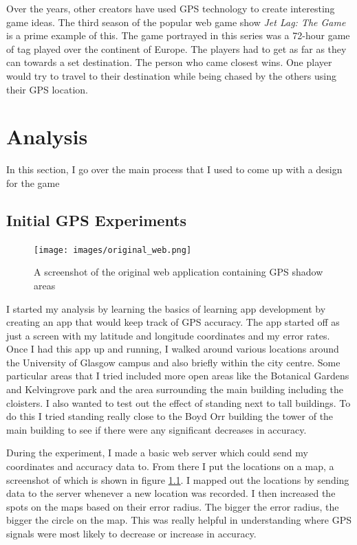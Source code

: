 \documentclass{l4proj}
\begin{document}
Over the years, other creators have used GPS technology to create interesting game ideas. The third season of the popular
web game show \emph{Jet Lag: The Game} is a prime example of this. The game portrayed in this series was a 72-hour game of
tag played over the continent of Europe. The players had to get as far as they can towards a set destination. The person
who came closest wins. One player would try to travel to their destination while being chased by the others using their
GPS location. \citep{Chase2022}

\chapter{Analysis}
\label{analysis}

In this section, I go over the main process that I used to come up with a design for the game

\section{Initial GPS Experiments}
\begin{figure}
    \centering
    \texttt{[image: images/original\_web.png]}
    \caption{A screenshot of the original web application containing GPS shadow areas}
    \label{fig:analysismap}
\end{figure}
I started my analysis by learning the basics of learning app development by creating an app that would keep track
of GPS accuracy. The app started off as just a screen with my latitude and longitude coordinates and my error rates.
Once I had this app up and running, I walked around various locations around the University of Glasgow campus and
also briefly within the city centre. Some particular areas that I tried included more open areas like the Botanical
Gardens and Kelvingrove park and the area surrounding the main building including the cloisters. I also wanted to test
out the effect of standing next to tall buildings. To do this I tried standing really close to the Boyd Orr building
the tower of the main building to see if there were any significant decreases in accuracy.

During the experiment, I made a basic web server which could send my coordinates and accuracy data to. From
there I put the locations on a map, a screenshot of which is shown in figure \ref{fig:analysismap}. I mapped
out the locations by sending data to the server whenever a new location was recorded. I then increased the spots
on the maps based on their error radius. The bigger the error radius, the bigger the circle on the map. This was
really helpful in understanding where GPS signals were most likely to decrease or increase in accuracy.
\end{document}

